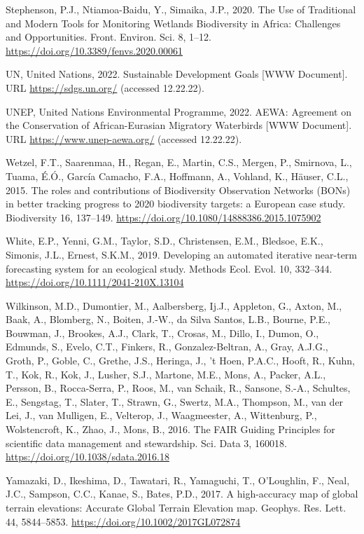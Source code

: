 \documentclass[utf8]{frontiersSCNS}
\begin{document}
Stephenson, P.J., Ntiamoa-Baidu, Y., Simaika, J.P., 2020. The Use of
Traditional and Modern Tools for Monitoring Wetlands Biodiversity in
Africa: Challenges and Opportunities. Front. Environ. Sci. 8, 1--12.
\url{https://doi.org/10.3389/fenvs.2020.00061}

UN, United Nations, 2022. Sustainable Development Goals {[}WWW
Document{]}. URL \url{https://sdgs.un.org/} (accessed 12.22.22).

UNEP, United Nations Environmental Programme, 2022. AEWA: Agreement on
the Conservation of African-Eurasian Migratory Waterbirds {[}WWW
Document{]}. URL \url{https://www.unep-aewa.org/} (accessed 12.22.22).

Wetzel, F.T., Saarenmaa, H., Regan, E., Martin, C.S., Mergen, P.,
Smirnova, L., Tuama, É.Ó., García Camacho, F.A., Hoffmann, A., Vohland,
K., Häuser, C.L., 2015. The roles and contributions of Biodiversity
Observation Networks (BONs) in better tracking progress to 2020
biodiversity targets: a European case study. Biodiversity 16, 137--149.
\url{https://doi.org/10.1080/14888386.2015.1075902}

White, E.P., Yenni, G.M., Taylor, S.D., Christensen, E.M., Bledsoe,
E.K., Simonis, J.L., Ernest, S.K.M., 2019. Developing an automated
iterative near-term forecasting system for an ecological study. Methods
Ecol. Evol. 10, 332--344. \url{https://doi.org/10.1111/2041-210X.13104}

Wilkinson, M.D., Dumontier, M., Aalbersberg, Ij.J., Appleton, G., Axton,
M., Baak, A., Blomberg, N., Boiten, J.-W., da Silva Santos, L.B.,
Bourne, P.E., Bouwman, J., Brookes, A.J., Clark, T., Crosas, M., Dillo,
I., Dumon, O., Edmunds, S., Evelo, C.T., Finkers, R., Gonzalez-Beltran,
A., Gray, A.J.G., Groth, P., Goble, C., Grethe, J.S., Heringa, J., 't
Hoen, P.A.C., Hooft, R., Kuhn, T., Kok, R., Kok, J., Lusher, S.J.,
Martone, M.E., Mons, A., Packer, A.L., Persson, B., Rocca-Serra, P.,
Roos, M., van Schaik, R., Sansone, S.-A., Schultes, E., Sengstag, T.,
Slater, T., Strawn, G., Swertz, M.A., Thompson, M., van der Lei, J., van
Mulligen, E., Velterop, J., Waagmeester, A., Wittenburg, P.,
Wolstencroft, K., Zhao, J., Mons, B., 2016. The FAIR Guiding Principles
for scientific data management and stewardship. Sci. Data 3, 160018.
\url{https://doi.org/10.1038/sdata.2016.18}

Yamazaki, D., Ikeshima, D., Tawatari, R., Yamaguchi, T., O'Loughlin, F.,
Neal, J.C., Sampson, C.C., Kanae, S., Bates, P.D., 2017. A high-accuracy
map of global terrain elevations: Accurate Global Terrain Elevation map.
Geophys. Res. Lett. 44, 5844--5853.
\url{https://doi.org/10.1002/2017GL072874}
\end{document}
